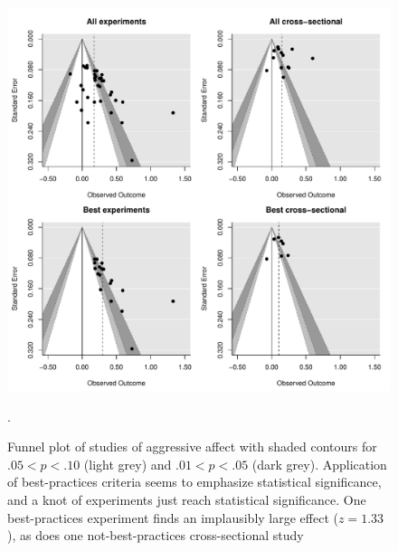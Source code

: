 \documentclass[man, mask]{apa6}
\begin{document}
\begin{figure}
	\includegraphics[width = \textwidth, keepaspectratio]{funnels-0_AggAff.pdf}
	\caption{Funnel plot of studies of aggressive affect with shaded contours for $.05 < p < .10$ (light grey) and $.01 < p < .05$ (dark grey). Application of best-practices criteria seems to emphasize statistical significance, and a knot of experiments just reach statistical significance. One best-practices experiment \citep{Ballard:Wiest:1996} finds an implausibly large effect ($z = 1.33$), as does one not-best-practices cross-sectional study \citep[$z = 0.60$]{Urashima:Suzuki:2003}}.
	\label{funnel-aggaff}
\end{figure}
\end{document}
